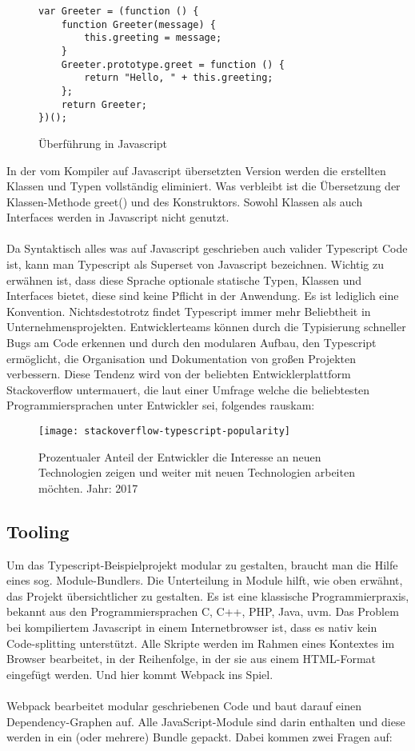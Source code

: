\begin{figure}[t]
\begin{lstlisting}
var Greeter = (function () {
    function Greeter(message) {
        this.greeting = message;
    }
    Greeter.prototype.greet = function () {
        return "Hello, " + this.greeting;
    };
    return Greeter;
})(); 
\end{lstlisting}
\caption{Überführung in Javascript \cite{typescript-example}}
\end{figure}
In der vom Kompiler auf Javascript übersetzten Version werden die erstellten Klassen und Typen vollständig eliminiert. Was verbleibt ist die Übersetzung der Klassen-Methode greet() und des Konstruktors. Sowohl Klassen als auch Interfaces werden in Javascript nicht genutzt.
\\\\
Da Syntaktisch alles was auf Javascript geschrieben auch valider Typescript Code ist, kann man Typescript als Superset von Javascript bezeichnen.
Wichtig zu erwähnen ist, dass diese Sprache optionale statische Typen, Klassen und Interfaces bietet, diese sind keine Pflicht in der Anwendung. Es ist lediglich eine Konvention.
Nichtsdestotrotz findet Typescript immer mehr Beliebtheit in Unternehmensprojekten. Entwicklerteams können durch die Typisierung schneller Bugs am Code erkennen und durch den modularen Aufbau, den Typescript ermöglicht, die Organisation und Dokumentation von großen Projekten verbessern. Diese Tendenz wird von der beliebten Entwicklerplattform Stackoverflow untermauert, die laut einer Umfrage welche die beliebtesten Programmiersprachen unter Entwickler sei, folgendes rauskam:

\begin{figure}[H]
\centering
\texttt{[image: stackoverflow-typescript-popularity]}
\caption{Prozentualer Anteil der Entwickler die Interesse an neuen Technologien zeigen und weiter mit neuen Technologien arbeiten möchten. Jahr: 2017 \cite{typescript-survey}}
\end{figure}

\subsection{Tooling}

Um das Typescript-Beispielprojekt modular zu gestalten, braucht man die Hilfe eines sog. \glqq Module-Bundlers\grqq{}. Die Unterteilung in Module hilft, wie oben erwähnt, das Projekt übersichtlicher zu gestalten. Es ist eine klassische Programmierpraxis, bekannt aus den Programmiersprachen C, C++, PHP, Java, uvm. Das Problem bei kompiliertem Javascript in einem Internetbrowser ist, dass es nativ kein Code-splitting unterstützt. Alle Skripte werden im Rahmen eines Kontextes im Browser bearbeitet, in der Reihenfolge, in der sie aus einem HTML-Format eingefügt werden. Und hier kommt Webpack ins Spiel. \cite{webpack-einfuehrung}
\\\\
Webpack bearbeitet modular geschriebenen Code und baut darauf einen Dependency-Graphen auf. Alle JavaScript-Module sind darin enthalten und diese werden in ein (oder mehrere) Bundle gepackt. Dabei kommen zwei Fragen auf:


